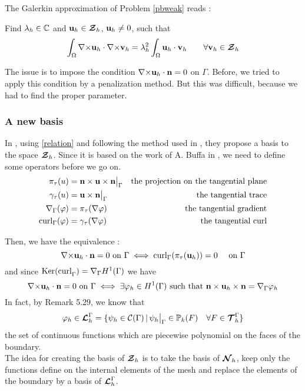 The Galerkin approximation of Problem \ref{pbweak} reads :
\begin{pb}\label{pbdiscr}
Find $\lambda_h\in{\mathbb{C}}$ and ${\mathbf{u}}_h\in{\bm{\mathcal{Z}}}_h$, ${\mathbf{u}}_h\ne
0$, such that
\[\int_\Omega {\nabla\times}{\mathbf{u}}_h\cdot{\nabla\times}{\mathbf{v}}_h =
\lambda_h^2\int_\Omega {\mathbf{u}}_h\cdot{\mathbf{v}}_h \quad\quad
\forall{\mathbf{v}}_h\in{\bm{\mathcal{Z}}}_h \]
\end{pb}

The issue is to impose the condition
${\nabla\times}{\mathbf{u}}_h\cdot{\mathbf{n}}=0$ on $\Gamma$. Before, we tried to apply this
condition by a penalization method. But this was difficult, because we had to
find the proper parameter.\\

\subsubsection{A new basis}
\label{base}
In \cite{Venegas2013}, using \ref{relation} and following the method used in
\cite{Meddahi2003,Salgado2005}, they propose a basis to the space ${\bm{\mathcal{Z}}}_h$.
Since it is based on the work of A. Buffa in \cite{Buffa2002845}, we need to
define some operators before we go on.
\begin{align*}
\pi_\tau(u) &= {\mathbf{n}}\times{\mathbf{u}}\times{\mathbf{n}}{\big\rvert_{\Gamma}} &\mbox{the projection on
  the tangential plane}\\
\gamma_\tau(u) &= {\mathbf{u}}\times{\mathbf{n}}{\big\rvert_{\Gamma}} &\mbox{the tangential
  trace}\\
{\nabla}_\Gamma(\varphi) &= \pi_\tau({\nabla}\varphi) &\mbox{the tangential gradient}\\
\mathrm{curl}_\Gamma(\varphi) &= \gamma_\tau({\nabla}\varphi) &\mbox{the tangential curl}
\end{align*}

Then, we have the equivalence :
\[ {\nabla\times}{\mathbf{u}}_h\cdot{\mathbf{n}}=0\mbox{ on }\Gamma \iff
\mathrm{curl}_\Gamma(\pi_\tau({\mathbf{u}}_h))=0\quad \mbox{ on } \Gamma \]
and since $\mathrm{Ker(curl}_\Gamma)={\nabla}_\Gamma H^1(\Gamma)$ we have 
\[ {\nabla\times}{\mathbf{u}}_h\cdot{\mathbf{n}}=0\mbox{ on }\Gamma \iff
\exists\varphi_h\in H^1(\Gamma) \mbox{ such that
}{\mathbf{n}}\times{\mathbf{u}}_h\times{\mathbf{n}} = {\nabla}_\Gamma\varphi_h \]
In fact, by \cite{Monk2003} Remark 5.29, we know that 
\[\varphi_h\in{\bm{\mathcal{L}}}_h^\Gamma = \{\psi_h\in\mathcal{C}(\Gamma) \,|\,
\psi_h{\big\rvert_{\Gamma}}\in{\mathbb{P}}_k(F) \quad \forall F\in{\bm{\mathcal{T}}}_h^\Gamma \}\]
the set of continuous functions which are piecewise polynomial on the faces of
the boundary.\\

The idea for creating the basis of ${\bm{\mathcal{Z}}}_h$ is to take the basis of ${\bm{\mathcal{N}}}_h$, keep
only the functions define on the internal elements of the mesh and replace the
elements of the boundary by a basis of ${\bm{\mathcal{L}}}_h^\Gamma$.\\

